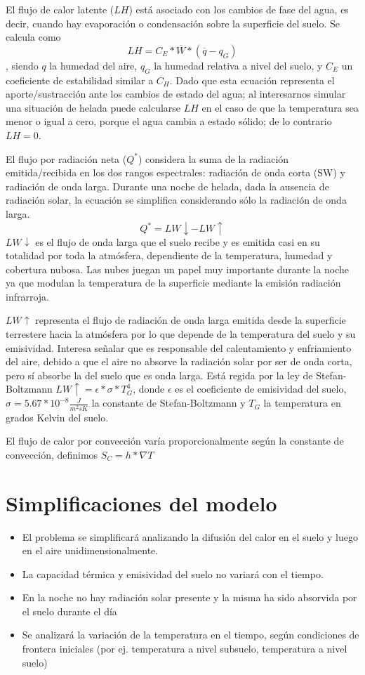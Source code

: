 \documentclass[final,a4paper]{llncs}
\begin{document}
El flujo de calor latente ($LH$) está asociado con los cambios de fase del agua, es decir, cuando hay 
evaporación o condensación sobre la superficie del suelo. Se calcula como
$$LH=C_E*\overline{W}*(\overline{q}-q_G)$$, siendo $q$ la humedad del aire, $q_G$ la humedad relativa a
nivel del suelo, y $C_E$ un coeficiente de estabilidad similar a $C_H$. Dado que esta ecuación representa 
el aporte/sustracción ante los cambios de estado del agua; al interesarnos simular una situación de helada
puede calcularse $LH$ en el caso de que la temperatura sea menor o igual a cero,
porque el agua cambia a estado sólido; de lo contrario $LH=0$.

El flujo por radiación neta ($Q^*$) considera la suma de la radiación emitida/recibida en los dos rangos
espectrales: radiación de onda corta (SW) y radiación de onda larga. Durante una noche de helada, dada
la ausencia de radiación solar, la ecuación se simplifica considerando sólo la radiación de onda larga.
$$ Q^*=LW \downarrow - LW \uparrow $$
$LW \downarrow$ es el flujo de onda larga que el suelo recibe y es emitida casi en su totalidad por toda la 
atmósfera, dependiente de la temperatura, humedad y cobertura nubosa. Las nubes juegan
un papel muy importante durante la noche ya que modulan la temperatura de la superficie mediante la emisión
radiación infrarroja. 

$LW \uparrow$ representa el flujo
de radiación de onda larga emitida desde la superficie terrestere hacia la atmósfera por lo que depende
de la temperatura del suelo y su emisividad. Interesa señalar que es responsable del calentamiento
y enfriamiento del aire, debido a que el aire no absorve la radiación solar por ser de onda corta, pero 
sí absorbe la del suelo que es onda larga. Está regida por la ley de Stefan-Boltzmann 
$LW \uparrow = \epsilon * \sigma * T_G^4 $, donde $\epsilon$ es el coeficiente de emisividad del suelo, 
$\sigma = 5.67 * 10^{-8} \frac{J}{m^2 s K}$ la constante de Stefan-Boltzmann y $T_G$ la temperatura en grados
Kelvin del suelo.

El flujo de calor por convección varía proporcionalmente según la constante de convección, definimos
$S_C = h * \nabla T$

\section{Simplificaciones del modelo} 
\begin{itemize}
\item El problema se simplificará analizando la difusión del calor en el suelo y luego en el aire unidimensionalmente.
\item La capacidad térmica y emisividad del suelo no variará con el tiempo.
\item En la noche no hay radiación solar presente y la misma ha sido absorvida por el suelo durante el día
\item Se analizará la variación de la temperatura en el tiempo, según condiciones de frontera iniciales 
(por ej. temperatura a nivel subsuelo, temperatura a nivel suelo)
\end{itemize}
\end{document}
